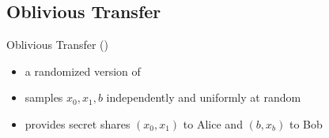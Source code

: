\subsection{Oblivious Transfer}
\begin{frame}{Oblivious Transfer (\OT)}
	
	
	\pause
	
	\begin{definition}
	\begin{itemize}
		\item a randomized version of \OT
		\item samples $ x_0, x_1, b  $ independently and uniformly at random 
		\item provides secret shares $ (x_0, x_1) $ to Alice and $ (b, x_b) $ to Bob
	\end{itemize}
	\end{definition}
\end{frame}

